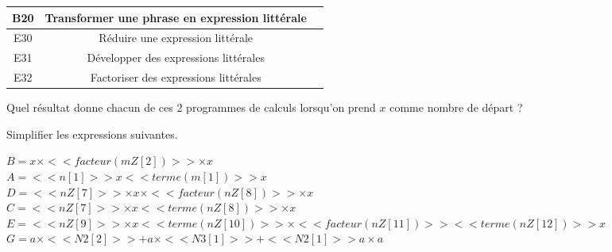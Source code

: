 \documentclass[a4paper,11pt,fleqn]{article}		%
\begin{document}
\vfill

{}\hfill {}
\begin{tabular}{|c|c|c|}
\hline 
B20 & Transformer une phrase en expression littérale & \hspace{1cm} \\ 
\hline 
E30 & Réduire une expression littérale &  \\ 
\hline 
E31 & Développer des expressions littérales &  \\
\hline 
E32 & Factoriser des expressions littérales &  \\
\hline 
\end{tabular} 
{}\hfill {}

\vfill

	
\exo{}
Quel résultat donne chacun de ces 2 programmes de calculs lorsqu'on prend $x$ comme nombre de départ ?	

\begin{center}

\medskip
{}
\end{center}

\exo{}

Simplifier les expressions suivantes.

\begin{multicols}{2}
$B=x\times <<facteur(mZ[2])>> \times x$\\
$A=<<n[1]>> x <<terme(m[1])>> x$\\

$D=<<nZ[7]>>\times x\times <<facteur(nZ[8])>>\times x$\\
$C=<<nZ[7]>>\times x <<terme(nZ[8])>>\times x$\\

$E=<<nZ[9]>> \times x<<terme(nZ[10])>>\times <<facteur(nZ[11])>> <<terme(nZ[12])>> x$\\
$G=a\times <<N2[2]>>+a\times <<N3[1]>>+<<N2[1]>> a\times  a$\\
\end{multicols}
\end{document}
